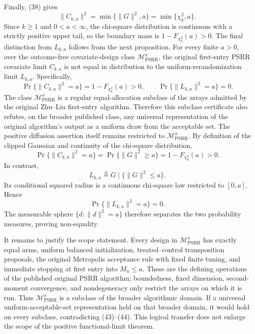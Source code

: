 Finally, (38) gives
\[
 \|C_{k,a}\|^2=\min\{\|G\|^2,a\}=\min\{\chi_k^2,a\}. \tag{42}
\]
Since \(k\ge1\) and \(0<a<\infty\), the chi-square distribution is continuous with a strictly positive upper tail, so the boundary mass is \(1-F_{\chi_k^2}(a)>0\).  The final distinction from \(L_{k,a}\) follows from the next proposition.
For every finite \(a>0\), over the outcome-free covariate-design class \(\mathcal M_{\mathrm{PSRR}}^{x}\), the original first-entry PSRR covariate limit \(C_{k,a}\) is not equal in distribution to the uniform-rerandomization limit \(L_{k,a}\).  Specifically,
\[
 \Pr\{\|C_{k,a}\|^2=a\}=1-F_{\chi_k^2}(a)>0,
 \qquad
 \Pr\{\|L_{k,a}\|^2=a\}=0.
\]
The class \(\mathcal M_{\mathrm{PSRR}}^{x}\) is a regular equal-allocation subclass of the arrays admitted by the original Zhu--Liu first-entry algorithm.  Therefore this subclass certificate also refutes, on the broader published class, any universal representation of the original algorithm's output as a uniform draw from the acceptable set.  The positive diffusion assertion itself remains restricted to \(\mathcal M_{\mathrm{PSRR}}^{x}\).
By definition of the clipped Gaussian and continuity of the chi-square distribution,
\[
 \Pr\{\|C_{k,a}\|^2=a\}
 =\Pr\{\|G\|^2\ge a\}
 =1-F_{\chi_k^2}(a)>0. \tag{43}
\]
In contrast,
\[
 L_{k,a}\overset d=G\mid\{\|G\|^2\le a\}.
\]
Its conditional squared radius is a continuous chi-square law restricted to \([0,a]\).  Hence
\[
 \Pr\{\|L_{k,a}\|^2=a\}=0. \tag{44}
\]
The measurable sphere \(\{d:\|d\|^2=a\}\) therefore separates the two probability measures, proving non-equality.

It remains to justify the scope statement.  Every design in \(\mathcal M_{\mathrm{PSRR}}^{x}\) has exactly equal arms, uniform balanced initialization, treated--control transposition proposals, the original Metropolis acceptance rule with fixed finite tuning, and immediate stopping at first entry into \(M_n\le a\).  These are the defining operations of the published original PSRR algorithm; boundedness, fixed dimension, second-moment convergence, and nondegeneracy only restrict the arrays on which it is run.  Thus \(\mathcal M_{\mathrm{PSRR}}^{x}\) is a subclass of the broader algorithmic domain.  If a universal uniform-acceptable-set representation held on that broader domain, it would hold on every subclass, contradicting (43)--(44).  This logical transfer does not enlarge the scope of the positive functional-limit theorem.
